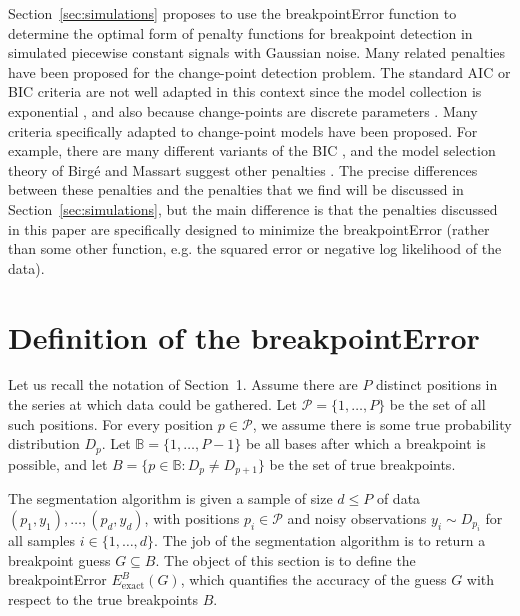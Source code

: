 \documentclass{jsfds} %
\begin{document}
Section~\ref{sec:simulations} proposes to use the breakpointError
function to determine the optimal form of penalty functions for
breakpoint detection in simulated piecewise constant signals with
Gaussian noise. Many related penalties have been proposed for the
change-point detection problem. The standard AIC or BIC criteria are
not well adapted in this context since the model collection is
exponential \citep{BM04,BIC,Akaike73,BGH09}, and also because
change-points are discrete parameters \citep{mBIC}.  Many criteria
specifically adapted to change-point models have been proposed.  For
example, there are many different variants of the BIC
\citep{Yao88,Lee95,mBIC}, and the model selection theory of Birg\'e
and Massart suggest other penalties
\citep{lavielle2005,lebarbier,BM04,calibration}. The precise
differences between these penalties and the penalties that we find
will be discussed in Section~\ref{sec:simulations}, but the main
difference is that the penalties discussed in this paper are
specifically designed to minimize the breakpointError (rather than
some other function, e.g. the squared error or negative log likelihood
of the data).


\newpage

\section{Definition of the breakpointError}
\label{sec:definition}

Let us recall the notation of Section~1. Assume there are $P$ distinct
positions in the series at which data could be gathered. Let $\mathcal
P= \{1,\dots,P\}$ be the set of all such positions. For every position
$p\in\mathcal P$, we assume there is some true probability
distribution $D_p$. Let $\mathbb B=\{1,\dots,P-1\}$ be all bases after
which a breakpoint is possible, and let $B = \{p\in \mathbb B : D_p
\neq D_{p+1}\}$ be the set of true breakpoints.

The segmentation algorithm is given a sample of size $d \leq P$ of
data $(p_1, y_1), \dots, (p_d, y_d)$, with positions $p_i\in\mathcal
P$ and noisy observations $y_i\sim D_{p_i}$ for all samples $i\in\{1,
\dots, d\}$. The job of the segmentation algorithm is to return a
breakpoint guess $G\subseteq B$. The object of this section is to
define the breakpointError $E^B_{\text{exact}}(G)$, which quantifies
the accuracy of the guess $G$ with respect to the true breakpoints
$B$.
\end{document}
